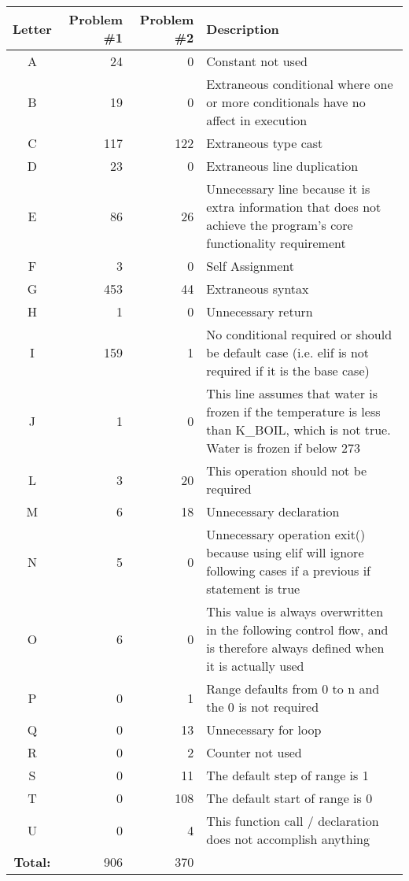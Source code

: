 \vspace{2em}
\small
\begin{supertabular}{crrp{.6\textwidth}}
\label{labelsB}
Letter & Problem \#1 & Problem \#2 & Description \\ 
\toprule
A & 24 & 0 & Constant not used \\
B & 19 & 0 & Extraneous conditional where one or more conditionals have no affect in execution  \\
C & 117 & 122 & Extraneous type cast \\
D & 23 & 0 & Extraneous line duplication \\
E & 86 & 26 & Unnecessary line because it is extra information that does not achieve the program's core functionality requirement \\
F & 3 & 0 & Self Assignment \\
G & 453 & 44 & Extraneous syntax \\
H & 1 & 0 & Unnecessary return \\
I & 159 & 1 & No conditional required or should be default case (i.e. elif is not required if it is the base case)  \\
J & 1 & 0 & This line assumes that water is frozen if the temperature is less than K\_BOIL, which is not true. Water is frozen if below 273 \\
L & 3 & 20 & This operation should not be required \\
M & 6 & 18 & Unnecessary declaration  \\
N & 5 & 0 & Unnecessary operation exit() because using elif will ignore following cases if a previous if statement is true \\
O & 6 & 0 & This value is always overwritten in the following control flow, and is therefore always defined when it is actually used \\
P & 0 & 1 & Range defaults from 0 to n and the 0 is not required \\
Q & 0 & 13 & Unnecessary for loop \\
R & 0 & 2 & Counter not used \\
S & 0 & 11 & The default step of range is 1 \\
T & 0 & 108 & The default start of range is 0 \\
U & 0 & 4 & This function call / declaration does not accomplish anything \\

\bottomrule
\textbf{Total:} & 906 & 370 & \\
\end{supertabular}
\vspace{2em}